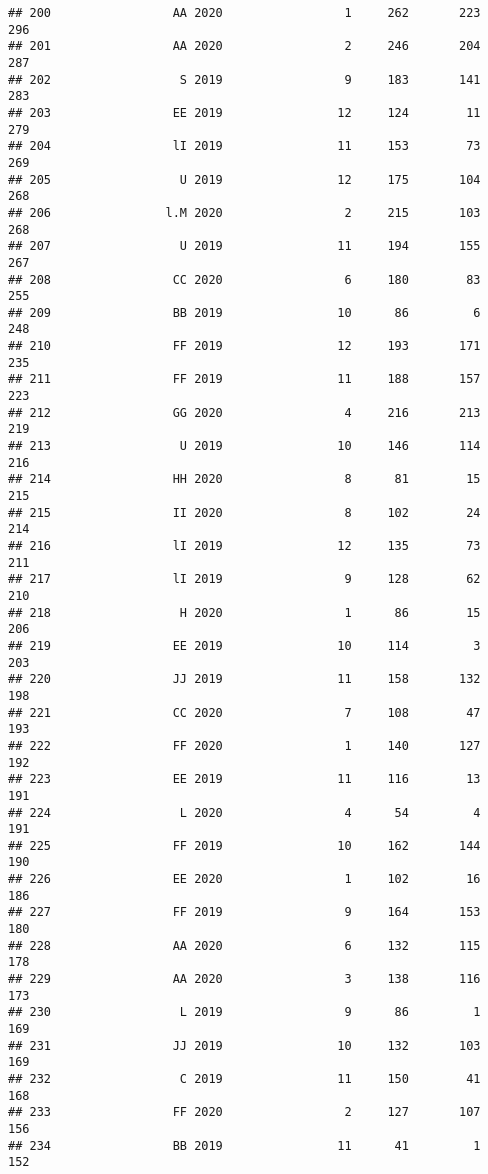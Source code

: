 \documentclass[
]{article}
\begin{document}
\begin{verbatim}
## 200                 AA 2020                 1     262       223      296
## 201                 AA 2020                 2     246       204      287
## 202                  S 2019                 9     183       141      283
## 203                 EE 2019                12     124        11      279
## 204                 lI 2019                11     153        73      269
## 205                  U 2019                12     175       104      268
## 206                l.M 2020                 2     215       103      268
## 207                  U 2019                11     194       155      267
## 208                 CC 2020                 6     180        83      255
## 209                 BB 2019                10      86         6      248
## 210                 FF 2019                12     193       171      235
## 211                 FF 2019                11     188       157      223
## 212                 GG 2020                 4     216       213      219
## 213                  U 2019                10     146       114      216
## 214                 HH 2020                 8      81        15      215
## 215                 II 2020                 8     102        24      214
## 216                 lI 2019                12     135        73      211
## 217                 lI 2019                 9     128        62      210
## 218                  H 2020                 1      86        15      206
## 219                 EE 2019                10     114         3      203
## 220                 JJ 2019                11     158       132      198
## 221                 CC 2020                 7     108        47      193
## 222                 FF 2020                 1     140       127      192
## 223                 EE 2019                11     116        13      191
## 224                  L 2020                 4      54         4      191
## 225                 FF 2019                10     162       144      190
## 226                 EE 2020                 1     102        16      186
## 227                 FF 2019                 9     164       153      180
## 228                 AA 2020                 6     132       115      178
## 229                 AA 2020                 3     138       116      173
## 230                  L 2019                 9      86         1      169
## 231                 JJ 2019                10     132       103      169
## 232                  C 2019                11     150        41      168
## 233                 FF 2020                 2     127       107      156
## 234                 BB 2019                11      41         1      152

\end{verbatim}
\end{document}
